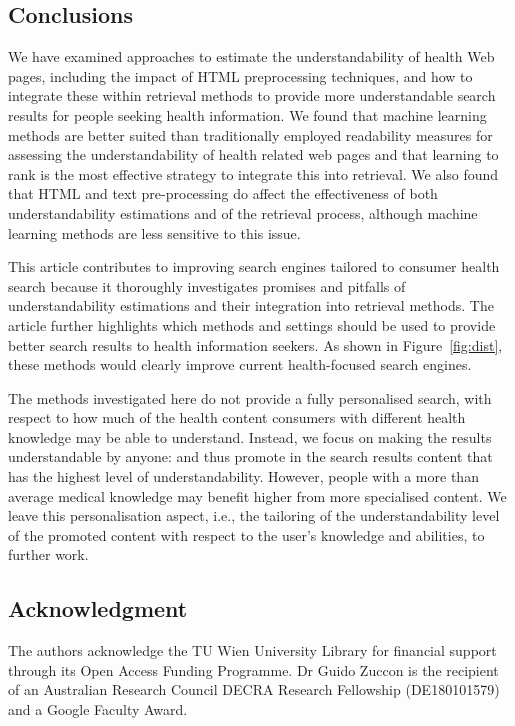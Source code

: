 \documentclass[10pt,a4paper]{article}
\begin{document}
\subsection*{Conclusions}

We have examined approaches to estimate the understandability of health Web pages, including the impact of HTML preprocessing techniques, and how to integrate these within retrieval methods to provide more understandable search results for people seeking health information. We found that machine learning methods are better suited than traditionally employed readability measures for assessing the understandability of health related web pages and that learning to rank is the most effective strategy to integrate this into retrieval. We also found that HTML and text pre-processing do affect the effectiveness of both understandability estimations and of the retrieval process, although machine learning methods are less sensitive to this issue.

This article contributes to improving search engines tailored to consumer health search because it thoroughly investigates promises and pitfalls of understandability estimations and their integration into retrieval methods. The article further highlights which methods and settings should be used to provide better search results to health information seekers. As shown in Figure~\ref{fig:dist}, these methods would clearly improve current health-focused search engines. 

The methods investigated here do not provide a fully personalised search, with respect to how much of the health content consumers with different health knowledge may be able to understand. Instead, we focus on making the results understandable by anyone: and thus promote in the search results content that has the highest level of understandability. However, people with a more than average medical knowledge may benefit higher from more specialised content. We leave this personalisation aspect, i.e., the tailoring of the understandability level of the promoted content with respect to the user's knowledge and abilities, to further work.

\subsection*{Acknowledgment}
The authors acknowledge the TU Wien University Library for financial support through its Open Access Funding Programme. Dr Guido Zuccon is the recipient of an Australian Research Council DECRA Research Fellowship (DE180101579) and a Google Faculty Award.
\end{document}

